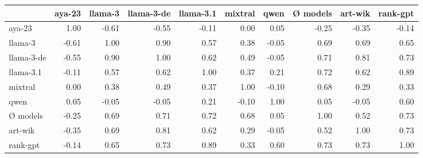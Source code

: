 \begin{tabular}{lrrrrrrrrr}
\toprule
 & aya-23 & llama-3 & llama-3-de & llama-3.1 & mixtral & qwen & Ø models & art-wik & rank-gpt \\
\midrule
aya-23 & 1.00 & -0.61 & -0.55 & -0.11 & 0.00 & 0.05 & -0.25 & -0.35 & -0.14 \\
llama-3 & -0.61 & 1.00 & 0.90 & 0.57 & 0.38 & -0.05 & 0.69 & 0.69 & 0.65 \\
llama-3-de & -0.55 & 0.90 & 1.00 & 0.62 & 0.49 & -0.05 & 0.71 & 0.81 & 0.73 \\
llama-3.1 & -0.11 & 0.57 & 0.62 & 1.00 & 0.37 & 0.21 & 0.72 & 0.62 & 0.89 \\
mixtral & 0.00 & 0.38 & 0.49 & 0.37 & 1.00 & -0.10 & 0.68 & 0.29 & 0.33 \\
qwen & 0.05 & -0.05 & -0.05 & 0.21 & -0.10 & 1.00 & 0.05 & -0.05 & 0.60 \\
Ø models & -0.25 & 0.69 & 0.71 & 0.72 & 0.68 & 0.05 & 1.00 & 0.52 & 0.73 \\
art-wik & -0.35 & 0.69 & 0.81 & 0.62 & 0.29 & -0.05 & 0.52 & 1.00 & 0.73 \\
rank-gpt & -0.14 & 0.65 & 0.73 & 0.89 & 0.33 & 0.60 & 0.73 & 0.73 & 1.00 \\
\bottomrule
\end{tabular}
